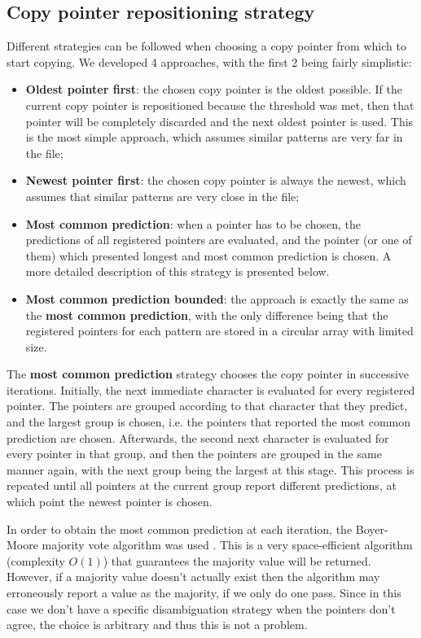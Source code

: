 \documentclass{article}
\begin{document}
\subsection{Copy pointer repositioning strategy}
\label{sec:copy-model-reposition}

Different strategies can be followed when choosing a copy pointer from which to start copying.
We developed 4 approaches, with the first 2 being fairly simplistic:
\begin{itemize}
    \item \textbf{Oldest pointer first}: the chosen copy pointer is the oldest possible. If the current copy pointer is repositioned because the threshold was met, then that pointer will be completely discarded and the next oldest pointer is used.
    This is the most simple approach, which assumes similar patterns are very far in the file;
    \item \textbf{Newest pointer first}: the chosen copy pointer is always the newest, which assumes that similar patterns are very close in the file;
    \item \textbf{Most common prediction}: when a pointer has to be chosen, the predictions of all registered pointers are evaluated, and the pointer (or one of them) which presented longest and most common prediction is chosen.
    A more detailed description of this strategy is presented below.
    \item \textbf{Most common prediction bounded}: the approach is exactly the same as the \textbf{most common prediction}, with the only difference being that the registered pointers for each pattern are stored in a circular array with limited size.
\end{itemize}

The \textbf{most common prediction} strategy chooses the copy pointer in successive iterations.
Initially, the next immediate character is evaluated for every registered pointer.
The pointers are grouped according to that character that they predict, and the largest group is chosen, i.e. the pointers that reported the most common prediction are chosen.
Afterwards, the second next character is evaluated for every pointer in that group, and then the pointers are grouped in the same manner again, with the next group being the largest at this stage.
This process is repeated until all pointers at the current group report different predictions, at which point the newest pointer is chosen.

In order to obtain the most common prediction at each iteration, the Boyer-Moore majority vote algorithm was used \cite{majority}.
This is a very space-efficient algorithm (complexity $O(1)$) that guarantees the majority value will be returned.
However, if a majority value doesn't actually exist then the algorithm may erroneously report a value as the majority, if we only do one pass.
Since in this case we don't have a specific disambiguation strategy when the pointers don't agree, the choice is arbitrary and thus this is not a problem.
\end{document}
